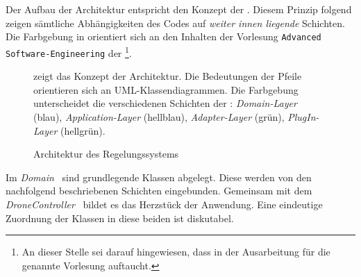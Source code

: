 
Der Aufbau der Architektur entspricht den Konzept der \clean. Diesem Prinzip folgend zeigen sämtliche Abhängigkeiten des Codes auf \textit{weiter innen liegende} Schichten.
Die Farbgebung in  orientiert sich an den Inhalten der Vorlesung \texttt{Advanced Software-Engineering} der \DHBW\footnote{An dieser Stelle sei darauf hingewiesen, dass  in der Ausarbeitung für die genannte Vorlesung auftaucht.}.

\begin{figure}[ht!]
\vspace{0.25cm}
\begin{center}
\caption{Architektur des Regelungssystems}
\label{fig:Packs}
\end{center}

\vspace{0.25cm}
 zeigt das Konzept der Architektur. Die Bedeutungen der Pfeile orientieren sich an UML-Klassendiagrammen. Die Farbgebung unterscheidet die verschiedenen Schichten der \clean: \textit{Domain-Layer} (blau), \textit{Application-Layer} (hellblau), \textit{Adapter-Layer} (grün), \textit{PlugIn-Layer} (hellgrün).
\end{figure}



Im \textit{Domain} \Pack\ sind grundlegende Klassen abgelegt. Diese werden von den nachfolgend beschriebenen Schichten eingebunden. Gemeinsam mit dem \textit{DroneController} \Pack\ bildet es das Herzstück der Anwendung. Eine eindeutige Zuordnung der Klassen in diese beiden \Pack[s] ist diskutabel.


